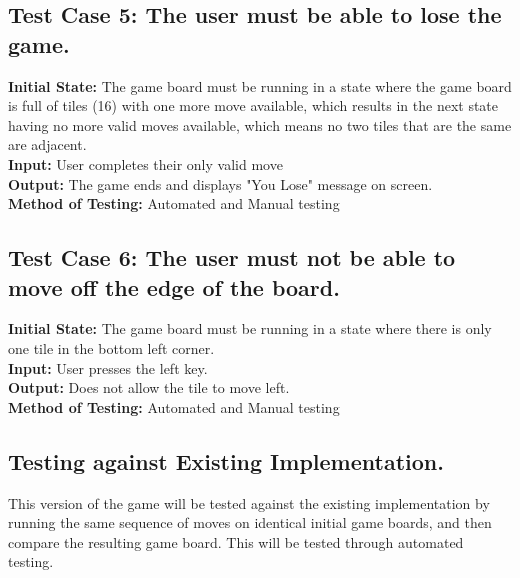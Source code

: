 \documentclass[12pt]{article}
\begin{document}
\subsection{Test Case 5: The user must be able to lose the game.}

\textbf{Initial State:} The game board must be running in a state where the game board 
is full of tiles (16) with one more move available, which results in the next 
state having no more valid moves available, which means no two tiles that are 
the same are adjacent.\\
\textbf{Input:} User completes their only valid move\\
\textbf{Output:} The game ends and displays "You Lose" message on screen.\\
\textbf{Method of Testing:} Automated and Manual testing

\subsection{Test Case 6: The user must not be able to move off the edge of the board.}

\textbf{Initial State:} The game board must be running in a state where there is only one tile in the bottom left corner.\\
\textbf{Input:} User presses the left key.\\
\textbf{Output:} Does not allow the tile to move left.\\
\textbf{Method of Testing:} Automated and Manual testing

\subsection{Testing against Existing Implementation.}
This version of the game will be tested against the existing implementation by running the same sequence of moves on identical initial game boards, and then compare the resulting game board. This will be tested through automated testing. 



\end{document}
